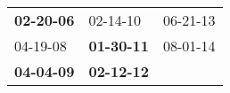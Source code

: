 \begin{supertabular}{p{0.33\columnwidth}p{0.33\columnwidth}p{0.33\columnwidth}}
 \textbf{02-20-06\textsuperscript{}} &           02-14-10\textsuperscript{} &  06-21-13\textsuperscript{} \\
          04-19-08\textsuperscript{} &  \textbf{01-30-11\textsuperscript{}} &  08-01-14\textsuperscript{} \\
 \textbf{04-04-09\textsuperscript{}} &  \textbf{02-12-12\textsuperscript{}} &                             \\
\end{supertabular}
